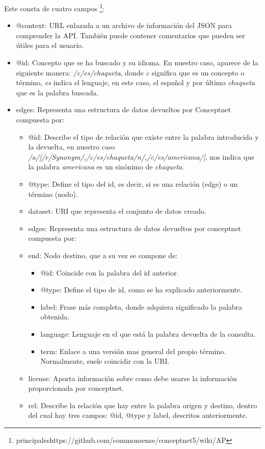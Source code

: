 	
Este consta de cuatro campos \footnote{principaleshttps://github.com/commonsense/conceptnet5/wiki/AP}:
\begin{itemize}
	\item @context: URL enlazada a un archivo de información del JSON para comprender la API. También puede contener comentarios que pueden ser útiles para el usuario.
	\item @id: Concepto que se ha buscado y su idioma. En nuestro caso, aparece de la siguiente manera: \textit{/c/es/chaqueta}, donde  \textit{c} significa que es un concepto o término,  \textit{es} indica el lenguaje, en este caso, el español y por último \textit{chaqueta} que es la palabra buscada.
	\item edges: Representa una estructura de datos devueltos por Conceptnet compuesta por:
	\begin{itemize}
		\item @id: Describe el tipo de relación que existe entre la palabra introducida y la devuelta, en nuestro caso \textit{/a/[/r/Synonym/,/c/es/chaqueta/n/,/c/es/americana/]}, nos indica que la palabra \textit{americana} es un sinónimo de \textit{chaqueta}.
		\item @type: Define el tipo del id, es decir, si es una relación (edge) o un término (nodo).
		\item dataset: URI que representa el conjunto de datos creado.
		\item edges: Representa una estructura de datos devueltos por conceptnet compuesta por:
		\item end: Nodo destino, que a su vez se compone de:	
		\begin{itemize}
			\item @id: Coincide con la palabra del id anterior.
			\item @type: Define el tipo de id, como se ha explicado anteriormente.
			\item label: Frase más completa, donde adquiera significado la palabra obtenida.
			\item language: Lenguaje en el que está la palabra devuelta de la consulta.
			\item term: Enlace a una versión mas general del propio término. Normalmente, suele coincidir con la URI.			
		\end{itemize}
		\item license: Aporta información sobre como debe usarse la información proporcionada por conceptnet.
		\item rel: Describe la relación que hay entre la palabra origen y destino, dentro del cual hay tres campos: @id, @type y label, descritos anteriormente.

\end{itemize}
\end{itemize}
